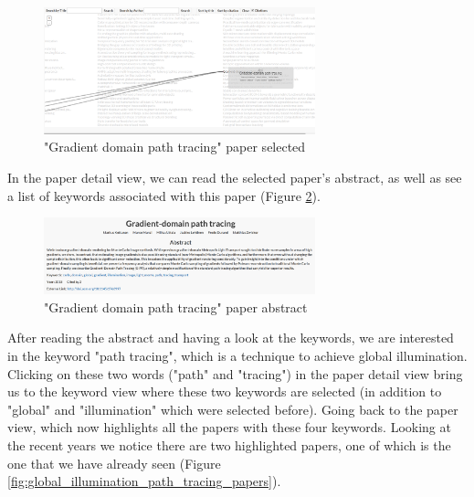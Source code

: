 \begin{figure}[ht]			
    \centering
    \includegraphics[width=0.7\textwidth]{gradient_domain_path_tracing.png}
    \caption{"Gradient domain path tracing" paper selected}
    \label{fig:gradient_domain_path_tracing_paper_selected}
\end{figure}

In the paper detail view, we can read the selected paper's abstract, as well as see a list of keywords associated with this paper (Figure \ref{fig:gradient_domain_path_tracing_paper_detail}).

\begin{figure}[ht]			
    \centering
    \includegraphics[width=0.7\textwidth]{gradient_domain_path_tracing_detail.png}
    \caption{"Gradient domain path tracing" paper abstract}
    \label{fig:gradient_domain_path_tracing_paper_detail}
\end{figure}

After reading the abstract and having a look at the keywords, we are interested in the keyword "path tracing", which is a technique to achieve global illumination. Clicking on these two words ("path" and "tracing") in the paper detail view bring us to the keyword view where these two keywords are selected (in addition to "global" and "illumination" which were selected before). Going back to the paper view, which now highlights all the papers with these four keywords. Looking at the recent years we notice there are two highlighted papers, one of which is the one that we have already seen (Figure \ref{fig:global_illumination_path_tracing_papers}).

